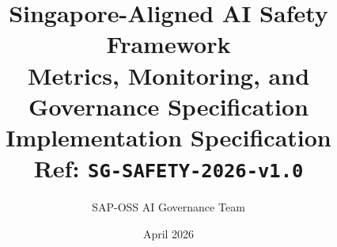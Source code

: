\documentclass[11pt,a4paper,twoside]{report}
\begin{document}
\title{\vspace{-2em}\Large Singapore-Aligned AI Safety Framework \\
       \textbf{Metrics, Monitoring, and Governance Specification} \\
       \large Implementation Specification \\
       \small Ref: \texttt{SG-SAFETY-2026-v1.0}}
\author{SAP-OSS AI Governance Team}
\date{April 2026}

\maketitle










\end{document}
